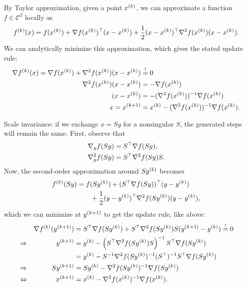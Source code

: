 \documentclass{article}
\begin{document}
By Taylor approximation, given a point \(\kth{x}\), we can approximate a function
\(f \in \mathcal{C}^2\) locally as
\begin{equation*}
  \kth{f}(x) = f(\kth{x}) + \T{\nabla f(\kth{x})}(x - \kth{x})
  + \frac{1}{2} \T{(x - \kth{x})} \nabla^2 f(\kth{x})(x - \kth{x}).
\end{equation*}
We can analytically minimize this approximation, which gives the stated update rule:
\begin{align*}
  \nabla \kth{f}(x) = \nabla f(\kth{x}) + \nabla^2 f(\kth{x})(x - \kth{x}) &\overset{!}{=} 0 \\
  \nabla^2 f(\kth{x})(x - \kth{x}) &= -\nabla f(\kth{x}) \\
  (x - \kth{x}) &= -(\nabla^2 f(\kth{x}))^{-1} \nabla f(\kth{x}) \\
  x = \kth[k+1]{x} &= \kth{x} - (\nabla^2 f(\kth{x}))^{-1} \nabla f(\kth{x}).
\end{align*}

Scale invariance: if we exchange \(x = Sy\) for a nonsingular \(S\), the generated steps will remain
the same.  First, observe that
\begin{align*}
  \nabla_y f(Sy) &= \T{S} \nabla f(Sy), \\
  \nabla_y^2 f(Sy) &= \T{S} \nabla^2 f(Sy) S.
\end{align*}
Now, the second-order approximation around \(S\kth{y}\) becomes
\begin{align*}
  \kth{f}(Sy) &= f(S\kth{y}) + \T{(\T{S} \nabla f(Sy))}(y - \kth{y}) \\
  &\qquad + \frac{1}{2} \T{(y - \kth{y})} \nabla^2 f(S\kth{y}) (y - \kth{y}),
\end{align*}
which we can minimize at \(\kth[k+1]{y}\) to get the update rule, like above:
\begin{align*}
  & &\nabla \kth{f}(\kth[k+1]{y}) &= \T{S} \nabla f(S\kth{y}) + \T{S} \nabla^2
                                 f(S\kth{y})S(\kth[k+1]{y}
                                 - \kth{y}) \overset{!}{=} 0 \\
  &\Rightarrow & \kth[k+1]{y} &= \kth{y} - \left( \T{S}\nabla^2 f(S\kth{y})S \right)^{-1} \T{S}
                                  \nabla f(S\kth{y}) \\
  &\phantom{\Rightarrow} & &= \kth{y} - S^{-1} \nabla^2 f(S\kth{y})^{-1} (\T{S})^{-1}
                                 \T{S} \nabla f(S\kth{y}) \\
  &\Rightarrow & S\kth[k+1]{y} &= S\kth{y} - \nabla^2 f(S\kth{y})^{-1} \nabla f(S\kth{y}) \\
  &\Leftrightarrow & \kth[k+1]{x} &= \kth{x} - \nabla^2 f(\kth{x})^{-1} \nabla f(\kth{x}).
\end{align*}
\end{document}
